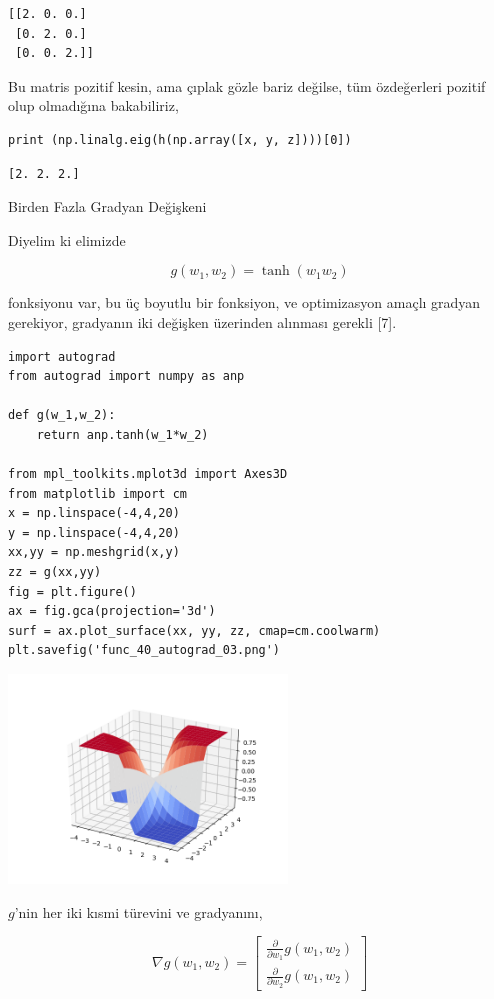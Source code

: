 \documentclass[12pt,fleqn]{article}\usepackage{../../common}
\begin{document}
\begin{verbatim}
[[2. 0. 0.]
 [0. 2. 0.]
 [0. 0. 2.]]
\end{verbatim}

Bu matris pozitif kesin, ama çıplak gözle bariz değilse, tüm özdeğerleri
pozitif olup olmadığına bakabiliriz, 

\begin{verbatim}
print (np.linalg.eig(h(np.array([x, y, z])))[0])
\end{verbatim}

\begin{verbatim}
[2. 2. 2.]
\end{verbatim}

Birden Fazla Gradyan Değişkeni

Diyelim ki elimizde 

$$
g(w_1,w_2) = \tanh (w_1w_2)
$$

fonksiyonu var, bu üç boyutlu bir fonksiyon, ve optimizasyon amaçlı gradyan
gerekiyor, gradyanın iki değişken üzerinden alınması gerekli [7]. 

\begin{verbatim}
import autograd
from autograd import numpy as anp

def g(w_1,w_2):
    return anp.tanh(w_1*w_2)

from mpl_toolkits.mplot3d import Axes3D
from matplotlib import cm
x = np.linspace(-4,4,20)
y = np.linspace(-4,4,20)
xx,yy = np.meshgrid(x,y)
zz = g(xx,yy)
fig = plt.figure()
ax = fig.gca(projection='3d')
surf = ax.plot_surface(xx, yy, zz, cmap=cm.coolwarm)
plt.savefig('func_40_autograd_03.png')
\end{verbatim}

\includegraphics[width=20em]{func_40_autograd_03.png}

$g$'nin her iki kısmi türevini ve gradyanını, 

$$
\nabla g(w_1,w_2) = \left[\begin{array}{r}
\frac{\partial }{\partial w_1} g(w_1,w_2) \\
\frac{\partial }{\partial w_2} g(w_1,w_2) 
\end{array}\right]
$$
\end{document}
